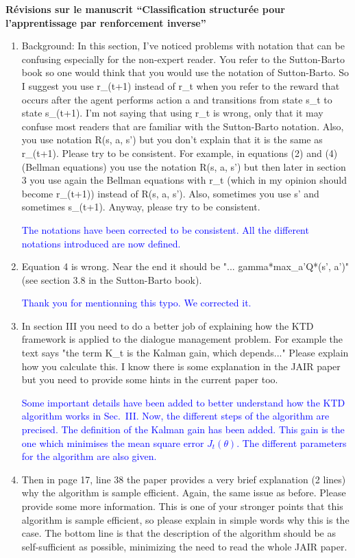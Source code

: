 \documentclass[11pt, a4paper]{letter}
\begin{document}
\begin{letter}{\large \textbf{Révisions sur le manuscrit ``Classification structurée pour l'apprentissage par renforcement inverse''}}
\begin{enumerate}
\item  Background: In this section, I've noticed problems with notation that can
 be confusing especially for the non-expert reader. You refer to the
 Sutton-Barto book so one would think that you would use the notation of
 Sutton-Barto. So I suggest you use r\_(t+1) instead of r\_t when you refer to
 the reward that occurs after the agent performs action a and transitions
 from state s\_t to state s\_(t+1). I'm not saying that using r\_t is wrong,
 only that it may confuse most readers that are familiar with the
 Sutton-Barto notation. Also, you use notation R(s, a, s') but you don't
 explain that it is the same as r\_(t+1). Please try to be consistent. For
 example, in equations (2) and (4) (Bellman equations) you use the notation
 R(s, a, s') but then later in section 3 you use again the Bellman equations
 with r\_t (which in my opinion should become r\_(t+1)) instead of R(s, a,
 s'). Also, sometimes you use s' and sometimes s\_(t+1). Anyway, please try
 to be consistent.

\textcolor{blue}{ The notations have been corrected to be
consistent. All the different notations introduced are now defined.}

\item Equation 4 is wrong. Near the end it should be "... gamma*max\_a'Q*(s', a')"
 (see section 3.8 in the Sutton-Barto book).

\textcolor{blue}{Thank you for mentionning this typo. We corrected
it.}

\item  In section III you need to do a better job of explaining how the KTD
 framework is applied to the dialogue management problem. For example the
 text says "the term K\_t is the Kalman gain, which depends..." Please
 explain how you calculate this. I know there is some explanation in the
 JAIR paper but you need to provide some hints in the current paper too.

\textcolor{blue}{ Some important details have been added to better
understand how the KTD algorithm works in Sec.~III. Now, the
different steps of the algorithm are precised. The definition of the
Kalman gain has been added. This gain is the one which minimises the
mean square error $J_t(\theta)$. The different parameters for the
algorithm are also given.}


\item  Then in page 17, line 38 the paper provides a very brief explanation (2
 lines) why the algorithm is sample efficient. Again, the same issue as
 before. Please provide some more information. This is one of your stronger
 points that this algorithm is sample efficient, so please explain in simple
 words why this is the case. The bottom line is that the description of the
 algorithm should be as self-sufficient as possible, minimizing the need to
 read the whole JAIR paper.


\end{enumerate}
\end{letter}
\end{document}

